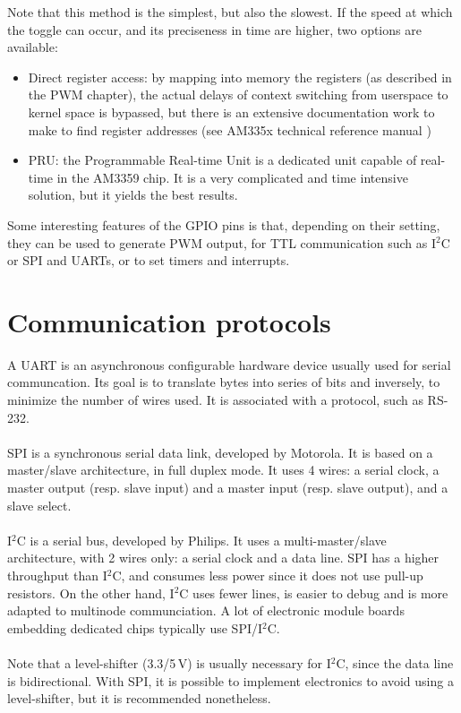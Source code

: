 Note that this method is the simplest, but also the slowest. If the speed at which the toggle can occur, and its preciseness in time are higher, two options are available:
\begin{itemize}
\item Direct register access: by mapping into memory the registers (as described in the PWM chapter), the actual delays of context switching from userspace to kernel space is bypassed, but there is an extensive documentation work to make to find register addresses (see AM335x technical reference manual \cite{amtrm})
\item PRU: the Programmable Real-time Unit is a dedicated unit capable of real-time in the AM3359 chip. It is a very complicated and time intensive solution, but it yields the best results.
\end{itemize}

Some interesting features of the GPIO pins is that, depending on their setting, they can be used to generate PWM output, for TTL communication such as I$^{2}$C or SPI and UARTs, or to set timers and interrupts.

\section{Communication protocols}

A UART is an asynchronous configurable hardware device usually used for serial communcation. Its goal is to translate bytes into series of bits and inversely, to minimize the number of wires used. It is associated with a protocol, such as RS-232.
\\
\\
SPI is a synchronous serial data link, developed by Motorola. It is based on a master/slave architecture, in full duplex mode. It uses 4 wires: a serial clock, a master output (resp. slave input) and a master input (resp. slave output), and a slave select.
\\
\\
I$^{2}$C is a serial bus, developed by Philips. It uses a multi-master/slave architecture, with 2 wires only: a serial clock and a data line. 
SPI has a higher throughput than I$^{2}$C, and consumes less power since it does not use pull-up resistors. On the other hand, I$^{2}$C uses fewer lines, is easier to debug and is more adapted to multinode communciation. A lot of electronic module boards embedding dedicated chips typically use SPI/I$^{2}$C.
\\
\\
Note that a level-shifter (3.3/5\,V) is usually necessary for I$^{2}$C, since the data line is bidirectional. With SPI, it is possible to implement electronics to avoid using a level-shifter, but it is recommended nonetheless.
